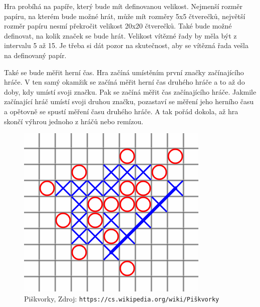 \documentclass[
11pt,
a4paper,
pdftex,
czech,
titlepage
]{report}
\begin{document}
Hra probíhá na papíře, který bude mít definovanou velikost. Nejmenší rozměr papíru, na kterém bude možné hrát, může mít rozměry 5x5 čtverečků, největší rozměr papíru nesmí překročit velikost 20x20 čtverečků. Také bude možné definovat, na kolik značek se bude hrát. Velikost vítězné řady by měla být z intervalu 5 až 15. Je třeba si dát pozor na skutečnost, aby se vítězná řada vešla na definovaný papír.

Také se bude měřit herní čas. Hra začíná umístěním první značky začínajícího hráče. V ten samý okamžik se začíná měřit herní čas druhého hráče a to až do doby, kdy umístí svoji značku. Pak se začíná měřit čas začínajícího hráče. Jakmile začínající hráč umístí svoji druhou značku, pozastaví se měření jeho herního času a opětovně se spustí měření času druhého hráče. A tak pořád dokola, až hra skončí výhrou jednoho z hráčů nebo remízou.\\


\begin{figure}[!ht]
	\centering
	\includegraphics[scale=0.9]{img/tic_tac_toe.png}
	\caption{Piškvorky, Zdroj: \texttt{https://cs.wikipedia.org/wiki/Piškvorky}}
	\label{data_model_obr}
\end{figure}
\end{document}
